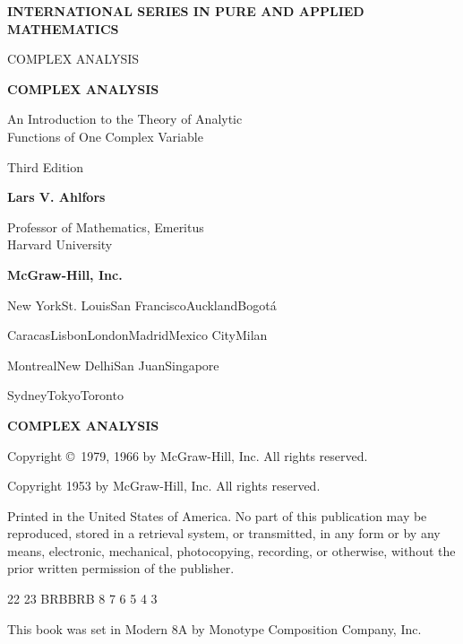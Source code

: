 \begin{titlepage}
\thispagestyle{empty}
\sffamily\bfseries
\small INTERNATIONAL SERIES IN PURE AND APPLIED MATHEMATICS
\par\vspace{2em}\Large COMPLEX ANALYSIS
\end{titlepage}
\begin{titlepage}
\thispagestyle{empty}
{\sffamily\bfseries\fontsize{23}{27}\selectfont COMPLEX ANALYSIS\par}
\vspace{1ex}
{\sffamily\large An Introduction to the Theory of Analytic\\
Functions of One Complex Variable\par}
\vspace{2ex}
{\sffamily Third Edition\par}
\vspace{4em}
{\sffamily\bfseries\large Lars V. Ahlfors\par}
{\sffamily Professor of Mathematics, Emeritus\\Harvard University\par}
\vfill
\textbf{McGraw-Hill, Inc.}\par
\small New York\quad St. Louis\quad San Francisco\quad Auckland\quad Bogotá\par
Caracas\quad Lisbon\quad London\quad Madrid\quad Mexico City\quad Milan\par
Montreal\quad New Delhi\quad San Juan\quad Singapore\par
Sydney\quad Tokyo\quad Toronto
\end{titlepage}
\clearpage
\thispagestyle{empty}
\null\vfill
\begingroup\footnotesize\setlength{\parindent}{0pt}
\textbf{\sffamily COMPLEX ANALYSIS}\par\medskip
Copyright \copyright\ 1979, 1966 by McGraw-Hill, Inc. All rights reserved.\par
Copyright 1953 by McGraw-Hill, Inc. All rights reserved.\par
Printed in the United States of America. No part of this publication may be
reproduced, stored in a retrieval system, or transmitted, in any form or by any
means, electronic, mechanical, photocopying, recording, or otherwise, without
the prior written permission of the publisher.\par
\medskip\centerline{22 23 BRBBRB 8 7 6 5 4 3}\medskip
This book was set in Modern 8A by Monotype Composition Company, Inc.\par
